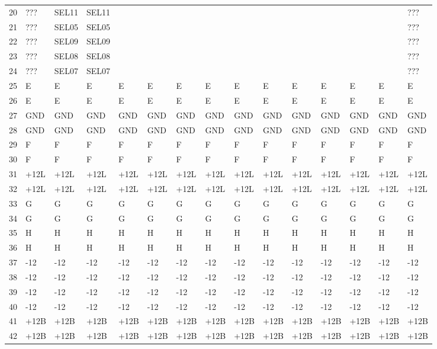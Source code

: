 \documentclass[hidelinks,11pt]{article}
\begin{document}
\begin{tiny}
\begin{tabularx}{\textwidth}{|l|X|X|X|X|X|X|X|X|X|X|X|X|X|X|}
    20 & ??? & SEL11 & SEL11 & & & & & & & & & & & ??? \\
    21 & ??? & SEL05 & SEL05 & & & & & & & & & & & ??? \\
    22 & ??? & SEL09 & SEL09 & & & & & & & & & & & ??? \\
    23 & ??? & SEL08 & SEL08 & & & & & & & & & & & ??? \\
    24 & ??? & SEL07 & SEL07 & & & & & & & & & & & ??? \\
    25 & E & E & E & E & E & E & E & E & E & E & E & E & E & E \\
    26 & E & E & E & E & E & E & E & E & E & E & E & E & E & E \\
    27 & GND & GND & GND & GND & GND & GND & GND & GND & GND & GND & GND & GND & GND & GND \\
    28 & GND & GND & GND & GND & GND & GND & GND & GND & GND & GND & GND & GND & GND & GND \\
    29 & F & F & F & F & F & F & F & F & F & F & F & F & F & F \\
    30 & F & F & F & F & F & F & F & F & F & F & F & F & F & F \\
    31 & +12L & +12L & +12L & +12L & +12L & +12L & +12L & +12L & +12L & +12L & +12L & +12L & +12L & +12L \\
    32 & +12L & +12L & +12L & +12L & +12L & +12L & +12L & +12L & +12L & +12L & +12L & +12L & +12L & +12L \\
    33 & G & G & G & G & G & G & G & G & G & G & G & G & G & G \\
    34 & G & G & G & G & G & G & G & G & G & G & G & G & G & G \\
    35 & H & H & H & H & H & H & H & H & H & H & H & H & H & H \\
    36 & H & H & H & H & H & H & H & H & H & H & H & H & H & H \\
    37 & -12 & -12 & -12 & -12 & -12 & -12 & -12 & -12 & -12 & -12 & -12 & -12 & -12 & -12 \\
    38 & -12 & -12 & -12 & -12 & -12 & -12 & -12 & -12 & -12 & -12 & -12 & -12 & -12 & -12 \\
    39 & -12 & -12 & -12 & -12 & -12 & -12 & -12 & -12 & -12 & -12 & -12 & -12 & -12 & -12 \\
    40 & -12 & -12 & -12 & -12 & -12 & -12 & -12 & -12 & -12 & -12 & -12 & -12 & -12 & -12 \\
    41 & +12B & +12B & +12B & +12B & +12B & +12B & +12B & +12B & +12B & +12B & +12B & +12B & +12B & +12B \\
    42 & +12B & +12B & +12B & +12B & +12B & +12B & +12B & +12B & +12B & +12B & +12B & +12B & +12B & +12B \\

\end{tabularx}
\end{tiny}
\end{document}
